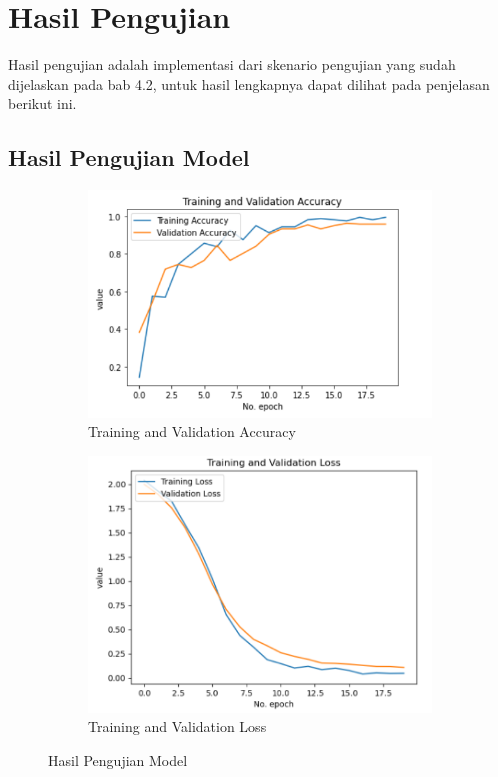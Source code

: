 \section{Hasil Pengujian}
\label{sec:hasilpengujian}

Hasil pengujian adalah implementasi dari skenario pengujian yang sudah dijelaskan pada bab 4.2, untuk hasil lengkapnya dapat dilihat pada penjelasan berikut ini.

\subsection{Hasil Pengujian Model}
\label{subsec:hasilpengujianmodel}

\begin{figure}[!htb]
  \centering
  \begin{subfigure}{0.52\textwidth}
    \centering
    \includegraphics[width=\linewidth]{gambar/training-validation-accuracy.png}
    \caption{Training and Validation Accuracy}
    \label{fig:Training and Validation Accuracy} 
  \end{subfigure}
  \begin{subfigure}{0.45\textwidth}
    \centering
    \includegraphics[width=\linewidth]{gambar/training-validation-loss.png}
    \caption{Training and Validation Loss}
    \label{fig:Training and Validation Loss} 
  \end{subfigure}
  \caption{Hasil Pengujian Model}
  \label{fig:Pengujian Training Validation}
\end{figure}

